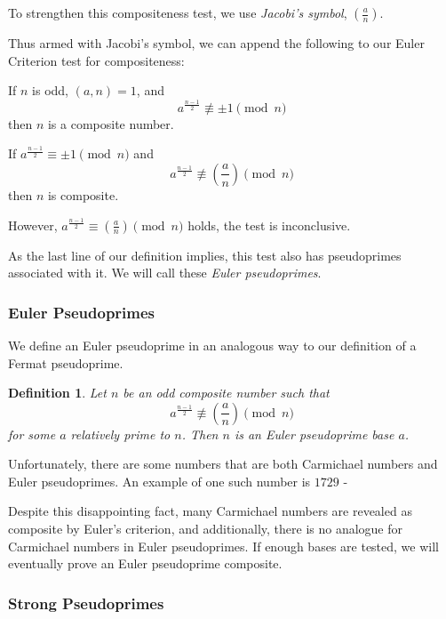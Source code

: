 \documentclass{article}
\newtheorem*{definition}{Definition}
\begin{document}
To strengthen this compositeness test, we use \textit{Jacobi's symbol}, $( \frac{a}{n})$.



%
%

Thus armed with Jacobi's symbol, we can append the following to our Euler Criterion test for compositeness:

\begin{eulerconverse}
If $n$ is odd, $(a,n) = 1$, and
	$$a^{\frac{n-1}{2}} \not\equiv \pm 1 \pmod n$$
	then $n$ is a composite number.
	
\par If $a^{\frac{n-1}{2}} \equiv \pm 1 \pmod n$ and
	$$a^{\frac{n-1}{2}} \not\equiv (\frac{a}{n}) \pmod n$$
	then $n$ is composite.
	
\par However, $a^{\frac{n-1}{2}} \equiv (\frac{a}{n}) \pmod n$ holds, the test is inconclusive.
\end{eulerconverse}

As the last line of our definition implies, this test also has pseudoprimes associated with it. We will call these \textit{Euler pseudoprimes}.
\subsubsection{Euler Pseudoprimes}
We define an Euler pseudoprime in an analogous way to our definition of a Fermat pseudoprime.
\begin{definition}
Let $n$ be an odd composite number such that
	 $$a^{\frac{n-1}{2}} \not\equiv (\frac{a}{n}) \pmod n$$ 
for some $a$ relatively prime to $n$.  Then $n$ is an \textit{Euler pseudoprime} base $a$.
\end{definition}

Unfortunately, there are some numbers that are both Carmichael numbers and Euler pseudoprimes. An example of one such number is $1729$ - %
\par Despite this disappointing fact,  many Carmichael numbers are revealed as composite by Euler's criterion, and additionally, there is no analogue for Carmichael numbers in Euler pseudoprimes. If enough bases are tested, we will eventually prove an Euler pseudoprime composite.
\subsubsection{Strong Pseudoprimes}
\end{document}
